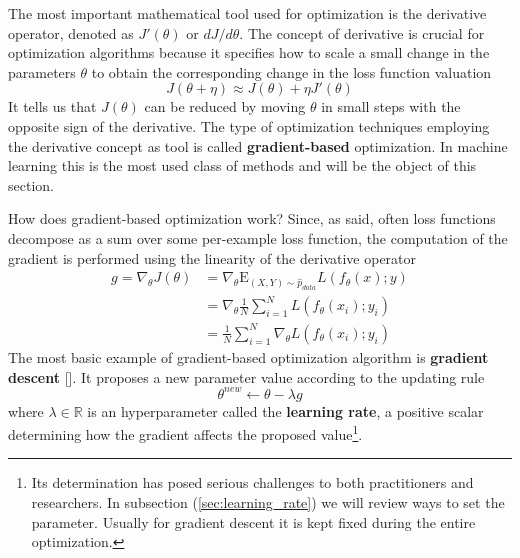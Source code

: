 The most important mathematical tool used for optimization is the derivative operator, denoted as $J'(\theta)$ or $dJ/d\theta$. The concept of derivative is crucial for optimization algorithms because it specifies how to scale a small change in the parameters $\theta$ to obtain the corresponding change in the loss function valuation 
$$J(\theta + \eta) \approx J(\theta) + \eta J'(\theta)$$
It tells us that $J(\theta)$ can be reduced by moving $\theta$ in small steps with the opposite sign of the derivative. The type of optimization techniques employing the derivative concept as tool is called \textbf{gradient-based} optimization. In machine learning this is the most used class of methods and will be the object of this section.

How does gradient-based optimization work? Since, as said, often loss functions decompose as a sum over some per-example loss function, the computation of the gradient is performed using the linearity of the derivative operator
\begin{align}\label{gradient}
    g = \nabla_{\theta} J(\theta) & = \nabla_{\theta} \mathrm{E}_{(X, Y) \sim \hat{p}_{data}} L\left( f_\theta(x) ; y \right)\\ \nonumber
    & = \nabla_{\theta} \frac{1}{N} \sum_{i=1}^{N} L\left( f_\theta(x_i) ; y_i \right) \\ \nonumber
    & = \frac{1}{N} \sum_{i=1}^{N} \nabla_{\theta} L\left( f_\theta(x_i) ; y_i \right)  
\end{align}
The most basic example of gradient-based optimization algorithm is \textbf{gradient descent} [\cite{Cauchy1847, Bishop2006}]. It proposes a new parameter value according to the updating rule
\begin{equation}
    \theta^{new} \leftarrow \theta - \lambda g \label{update_rule}
\end{equation}
where $\lambda \in \mathbb{R}$ is an hyperparameter called the \textbf{learning rate}, a positive scalar determining how the gradient affects the proposed value\footnote{Its determination has posed serious challenges to both practitioners and researchers. In subsection (\cref{sec:learning_rate}) we will review ways to set the parameter. Usually for  gradient descent it is kept fixed during the entire optimization.}.

